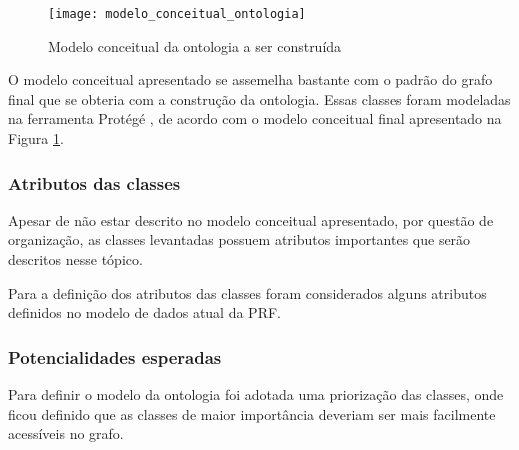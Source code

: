       \begin{figure}[!htb]
	\centering
	\texttt{[image: modelo\_conceitual\_ontologia]}
	\caption[Modelo conceitual da ontologia]{Modelo conceitual da ontologia a ser construída}
	\label{fig:modelo_conceitual_ontologia}
      \end{figure}
      
      O modelo conceitual apresentado se assemelha bastante com o padrão do grafo final que se obteria com a construção da
      ontologia.
      Essas classes foram modeladas na ferramenta Protégé \footnotemark[2], de acordo com o modelo conceitual final
      apresentado na Figura \ref{fig:modelo_conceitual_ontologia}.

    
    \pagebreak
    \subsubsection{Atributos das classes}
      
      Apesar de não estar descrito no modelo conceitual apresentado, por questão de organização, as classes levantadas
      possuem atributos importantes que serão descritos nesse tópico.
      
      Para a definição dos atributos das classes foram considerados alguns atributos definidos no modelo de dados atual da PRF.\\
      
      
      
    \pagebreak
    \subsubsection{Potencialidades esperadas}
	
	Para definir o modelo da ontologia foi adotada uma priorização das classes, onde ficou definido que as classes
	de maior importância deveriam ser mais facilmente acessíveis no grafo.